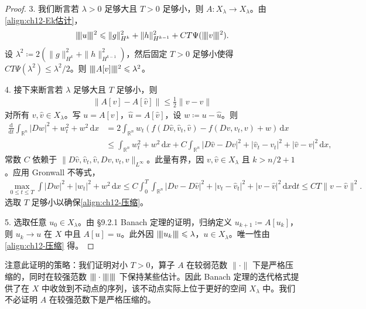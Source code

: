 \documentclass[../../main.tex]{subfiles}
\begin{document}
\begin{proof}
3. 我们断言若 $\lambda>0$ 足够大且 $T>0$ 足够小，则 $A:X_\lambda\to X_\lambda$。由\eqref{align:ch12-Ek估计}，
\begin{align*}
\|\!\| u\|\!\|^2\leqslant\|g\|_{H^k}^2+\|h\|_{H^{k-1}}^2+CT\Psi(\|\!\| v\|\!\|^2).
\end{align*}
设 $\lambda^2\coloneqq 2(\|g\|_{H^k}^2+\|h\|_{H^{k-1}}^2)$，然后固定 $T>0$ 足够小使得 $CT\Psi(\lambda^2)\leqslant\lambda^2/2$。则 $\|\!\| A[v]\|\!\|^2\leqslant\lambda^2$。

4. 接下来断言若 $\lambda$ 足够大且 $T$ 足够小，则
\begin{align}
\|A[v]-A[\widehat{v}]\|\leqslant\frac{1}{2}\|v-\widehat{v}\|
\label{align:ch12-压缩}
\end{align}
对所有 $v,\widehat{v}\in X_\lambda$。写 $u=A[v]$，$\widehat{u}=A[\widehat{v}]$，设 $w\coloneqq u-\widehat{u}$。则
\begin{align*}
\frac{\mathrm{d}}{\mathrm{d}t}\int_{\mathbb{R}^n}|Dw|^2+w_t^2+w^2\,\mathrm{d}x
&=2\int_{\mathbb{R}^n}w_t(f(D\widehat{v},\widehat{v}_t,\widehat{v})-f(Dv,v_t,v)+w)\,\mathrm{d}x\\
&\leqslant\int_{\mathbb{R}^n}w_t^2+w^2\,\mathrm{d}x
+C\int_{\mathbb{R}^n}|D\widehat{v}-Dv|^2+|\widehat{v}_t-v_t|^2+|\widehat{v}-v|^2\,\mathrm{d}x,
\end{align*}
常数 $C$ 依赖于 $\|D\widehat{v},\widehat{v}_t,\widehat{v},Dv,v_t,v\|_{L^\infty}$。此量有界，因 $v,\widehat{v}\in X_\lambda$ 且 $k>n/2+1$。应用 Gronwall 不等式，
\begin{align*}
\max_{0\leqslant t\leqslant T}\int|Dw|^2+|w_t|^2+w^2\,\mathrm{d}x\leqslant C\int_0^T\int_{\mathbb{R}^n}|Dv-D\widehat{v}|^2+|v_t-\widehat{v}_t|^2+|v-\widehat{v}|^2\,\mathrm{d}x\mathrm{d}t\leqslant CT\|v-\widehat{v}\|^2.
\end{align*}
选取 $T$ 足够小以确保\eqref{align:ch12-压缩}。

5. 选取任意 $u_0\in X_\lambda$。由 \S9.2.1 Banach 定理的证明，归纳定义 $u_{k+1}\coloneqq A[u_k]$，则 $u_k\to u$ 在 $X$ 中且 $A[u]=u$。此外因 $\|\!\| u_k\|\!\|\leqslant\lambda$，$u\in X_\lambda$。唯一性由\eqref{align:ch12-压缩} 得。
\end{proof}

注意此证明的策略：我们证明对小 $T>0$，算子 $A$ 在较弱范数 $\|\cdot\|$ 下是严格压缩的，同时在较强范数 $\|\!\|\cdot\|\!\|\|\!\|$ 下保持某些估计。因此 Banach 定理的迭代格式提供了在 $X$ 中收敛到不动点的序列，该不动点实际上位于更好的空间 $X_\lambda$ 中。我们不必证明 $A$ 在较强范数下是严格压缩的。
\end{document}
